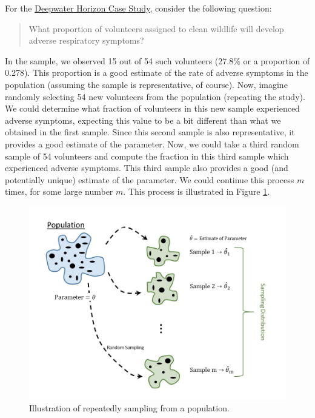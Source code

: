 \documentclass[]{book}
\theoremstyle{definition}
\theoremstyle{definition}
\theoremstyle{definition}
\theoremstyle{remark}
\begin{document}
For the \protect\hyperlink{DeepwaterCase}{Deepwater Horizon Case Study},
consider the following question:

\begin{quote}
What proportion of volunteers assigned to clean wildlife will develop
adverse respiratory symptoms?
\end{quote}

In the sample, we observed 15 out of 54 such volunteers (27.8\% or a
proportion of 0.278). This proportion is a good estimate of the rate of
adverse symptoms in the population (assuming the sample is
representative, of course). Now, imagine randomly selecting 54 new
volunteers from the population (repeating the study). We could determine
what fraction of volunteers in this new sample experienced adverse
symptoms, expecting this value to be a bit different than what we
obtained in the first sample. Since this second sample is also
representative, it provides a good estimate of the parameter. Now, we
could take a third random sample of 54 volunteers and compute the
fraction in this third sample which experienced adverse symptoms. This
third sample also provides a good (and potentially unique) estimate of
the parameter. We could continue this process \(m\) times, for some
large number \(m\). This process is illustrated in Figure
\ref{fig:samplingdistns-sampling-distribution}.

\begin{figure}

{\centering \includegraphics[width=0.8\linewidth]{./images/SamplingDistns-Sampling-Distribution} 

}

\caption{Illustration of repeatedly sampling from a population.}\label{fig:samplingdistns-sampling-distribution}
\end{figure}
\end{document}
